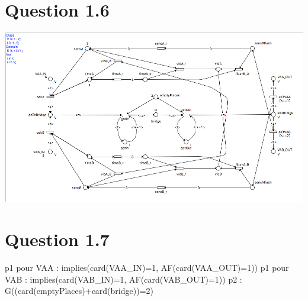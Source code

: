 \documentclass[a4paper, 11pt]{article}
\begin{document}
\section{Question 1.6}
\includegraphics[scale=0.35]{bridge.png}

\section{Question 1.7}
p1 pour VAA : implies(card(VAA\_IN)=1, AF(card(VAA\_OUT)=1))
p1 pour VAB : implies(card(VAB\_IN)=1, AF(card(VAB\_OUT)=1))
p2 : G((card(emptyPlaces)+card(bridge))=2)
\end{document}
